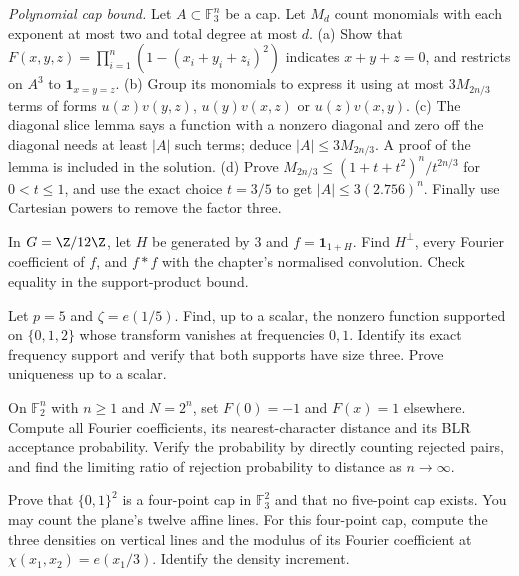 \begin{exercise}[$\star\star\star$]\label{ex:capset}
\emph{Polynomial cap bound.} Let $A\subset\mathbb F_3^n$ be a cap. Let $M_d$ count monomials with each exponent at most two and total degree at most $d$.
(a) Show that $F(x,y,z)=\prod_{i=1}^n(1-(x_i+y_i+z_i)^2)$ indicates $x+y+z=0$, and restricts on $A^3$ to $\mathbf1_{x=y=z}$.
(b) Group its monomials to express it using at most $3M_{2n/3}$ terms of forms $u(x)v(y,z)$, $u(y)v(x,z)$ or $u(z)v(x,y)$.
(c) The diagonal slice lemma says a function with a nonzero diagonal and zero off the diagonal needs at least $|A|$ such terms; deduce $|A|\le3M_{2n/3}$. A proof of the lemma is included in the solution.
(d) Prove $M_{2n/3}\le(1+t+t^2)^n/t^{2n/3}$ for $0<t\le1$, and use the exact choice $t=3/5$ to get $|A|\le3(2.756)^n$. Finally use Cartesian powers to remove the factor three.
\end{exercise}

\begin{exercise}[$\star\star$]\label{ex:v8c12a}
In $G=\Z/12\Z$, let $H$ be generated by $3$ and $f=\mathbf1_{1+H}$. Find $H^\perp$, every Fourier coefficient of $f$, and $f*f$ with the chapter's normalised convolution. Check equality in the support-product bound.
\end{exercise}
\begin{exercise}[$\star\star$]\label{ex:v8c12b}
Let $p=5$ and $\zeta=e(1/5)$. Find, up to a scalar, the nonzero function supported on $\{0,1,2\}$ whose transform vanishes at frequencies $0,1$. Identify its exact frequency support and verify that both supports have size three. Prove uniqueness up to a scalar.
\end{exercise}
\begin{exercise}[$\star\star$]\label{ex:v8c12c}
On $\mathbb F_2^n$ with $n\ge1$ and $N=2^n$, set $F(0)=-1$ and $F(x)=1$ elsewhere. Compute all Fourier coefficients, its nearest-character distance and its BLR acceptance probability. Verify the probability by directly counting rejected pairs, and find the limiting ratio of rejection probability to distance as $n\to\infty$.
\end{exercise}
\begin{exercise}[$\star\star$]\label{ex:v8c12d}
Prove that $\{0,1\}^2$ is a four-point cap in $\mathbb F_3^2$ and that no five-point cap exists. You may count the plane's twelve affine lines. For this four-point cap, compute the three densities on vertical lines and the modulus of its Fourier coefficient at $\chi(x_1,x_2)=e(x_1/3)$. Identify the density increment.
\end{exercise}

